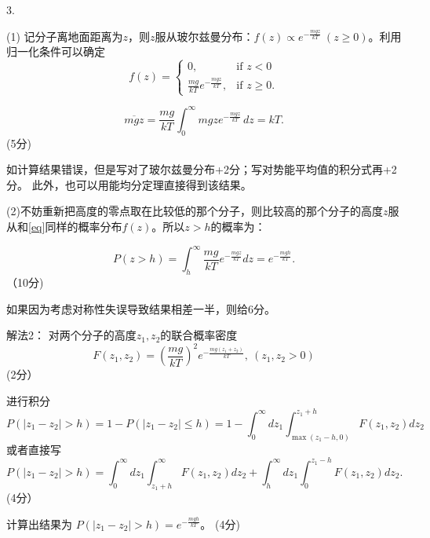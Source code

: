 \documentclass[12pt,CJK]{article}
\begin{document}
\item[3.]{

  (1) 记分子离地面距离为$z$，则$z$服从玻尔兹曼分布：$f(z) \propto e^{-\frac{mgz}{kT}}\ (z\ge 0)$。利用归一化条件可以确定
    \begin{equation}
      f(z) =\left\{\begin{array}{ll}
      0, &  \text{if } z<0 \\
       \frac{mg}{kT} e^{-\frac{mgz}{kT}}, & \text{if } z\ge 0.
      \end{array}\right.
      \label{eq}
    \end{equation}
      
  $$ \overline{mgz} = \frac{mg}{kT} \int_0^\infty mgz e^{-\frac{mgz}{kT}}\,dz = kT.$$
(5分)

    {\gray 如计算结果错误，但是写对了玻尔兹曼分布+2分；写对势能平均值的积分式再+2分。}
    {\gray 此外，也可以用能均分定理直接得到该结果。}

      \skiplines
    (2)不妨重新把高度的零点取在比较低的那个分子，则比较高的那个分子的高度$z$服从和\eqref{eq}同样的概率分布$f(z)$。所以$z>h$的概率为：
    
    $$P(z>h) = \int_h^\infty \frac{mg}{kT}e^{-\frac{mgz}{kT}} dz = e^{-\frac{mgh}{kT}}.$$
    （10分)

      {\gray     如果因为考虑对称性失误导致结果相差一半，则给6分。   }
      
      {\gray

      解法2： 对两个分子的高度$z_1,z_2$的联合概率密度
      $$F(z_1, z_2) = \left(\frac{mg}{kT}\right)^2e^{-\frac{mg(z_1+z_2)}{kT}},\ (z_1,z_2>0)$$
      (2分）
    
     进行积分
     $$P(|z_1-z_2|> h) = 1- P(|z_1-z_2|\le h) = 1- \int_0^\infty dz_1 \int_{\max(z_1-h,0)}^{z_1+h} F(z_1,z_2) dz_2 $$
     或者直接写
     $$P(|z_1-z_2|> h) = \int_0^\infty dz_1 \int_{z_1+h}^\infty F(z_1,z_2) dz_2 + \int_h^\infty dz_1 \int_0^{z_1-h} F(z_1,z_2) dz_2.$$
     (4分）
    
    计算出结果为  $P(|z_1-z_2|> h)  = e^{-\frac{mgh}{kT}}$。 (4分)


    }
}

  \eitem


\ech
\end{document}
